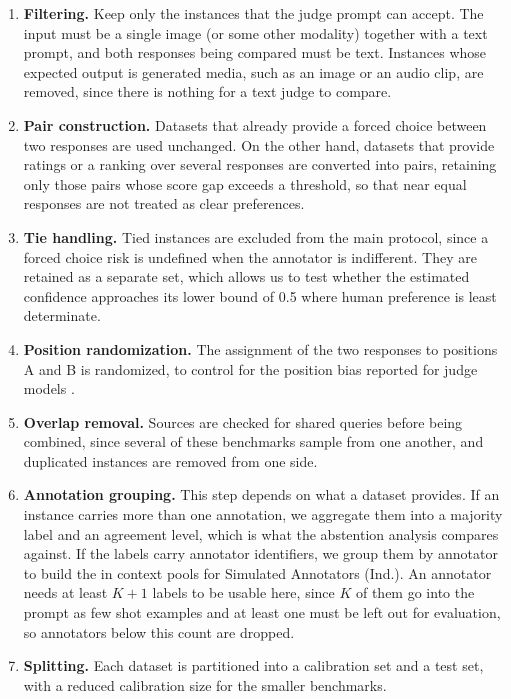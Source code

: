 \documentclass[11pt,a4paper]{article}
\begin{document}
\begin{enumerate}
\item \textbf{Filtering.} Keep only the instances that the judge prompt can accept. The
input must be a single image (or some other modality) together with a text prompt, and both responses being compared must be text. Instances whose expected output is generated media, such as an image or an
audio clip, are removed, since there is nothing for a text judge to compare.
\item \textbf{Pair construction.} Datasets that already provide a forced choice between
two responses are used unchanged. On the other hand, datasets that provide ratings or a ranking over several
responses are converted into pairs, retaining only those pairs whose score gap exceeds a
threshold, so that near equal responses are not treated as clear preferences.
\item \textbf{Tie handling.} Tied instances are excluded from the main protocol, since a
forced choice risk is undefined when the annotator is indifferent. They are retained as a
separate set, which allows us to test whether the estimated confidence approaches its lower
bound of 0.5 where human preference is least determinate.
\item \textbf{Position randomization.} The assignment of the two responses to positions A
and B is randomized, to control for the position bias reported for judge models
\citep{wang2023large}.
\item \textbf{Overlap removal.} Sources are checked for shared queries before being
combined, since several of these benchmarks sample from one another, and duplicated
instances are removed from one side.
\item \textbf{Annotation grouping.} This step depends on what a dataset provides. If an
instance carries more than one annotation, we aggregate them into a majority label and an
agreement level, which is what the abstention analysis compares against. If the labels
carry annotator identifiers, we group them by annotator to build the in context pools for
Simulated Annotators (Ind.). An annotator needs at least $K+1$ labels to be usable here,
since $K$ of them go into the prompt as few shot examples and at least one must be left
out for evaluation, so annotators below this count are dropped.
\item \textbf{Splitting.} Each dataset is partitioned into a calibration set and a test
set, with a reduced calibration size for the smaller benchmarks.
\end{enumerate}
\end{document}
